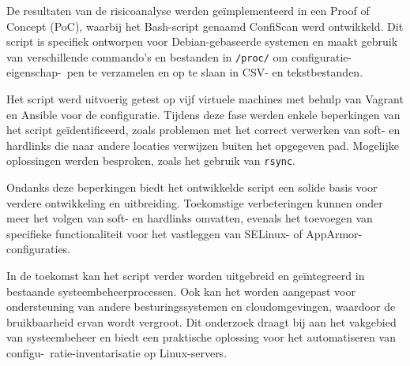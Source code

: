 De resultaten van de risicoanalyse werden ge\"implementeerd in een Proof of Concept (PoC), waarbij het Bash-script genaamd ConfiScan werd ontwikkeld.
Dit script is specifiek ontworpen voor Debian-gebaseerde systemen en maakt gebruik van verschillende commando's en bestanden in \texttt{/proc/} om configuratie-eigenschap-\ pen te verzamelen en op te slaan in CSV- en tekstbestanden.

Het script werd uitvoerig getest op vijf virtuele machines met behulp van Vagrant en Ansible voor de configuratie.
Tijdens deze fase werden enkele beperkingen van het script ge\"identificeerd, zoals problemen met het correct verwerken van soft- en hardlinks die naar andere locaties verwijzen buiten het opgegeven pad.
Mogelijke oplossingen werden besproken, zoals het gebruik van \texttt{rsync}.

Ondanks deze beperkingen biedt het ontwikkelde script een solide basis voor verdere ontwikkeling en uitbreiding.
Toekomstige verbeteringen kunnen onder meer het volgen van soft- en hardlinks omvatten, evenals het toevoegen van specifieke functionaliteit voor het vastleggen van SELinux- of AppArmor-configuraties.

In de toekomst kan het script verder worden uitgebreid en ge\"integreerd in bestaande systeembeheerprocessen.
Ook kan het worden aangepast voor ondersteuning van andere besturingssystemen en cloudomgevingen, waardoor de bruikbaarheid ervan wordt vergroot.
Dit onderzoek draagt bij aan het vakgebied van systeembeheer en biedt een praktische oplossing voor het automatiseren van configu-\ ratie-inventarisatie op Linux-servers.
